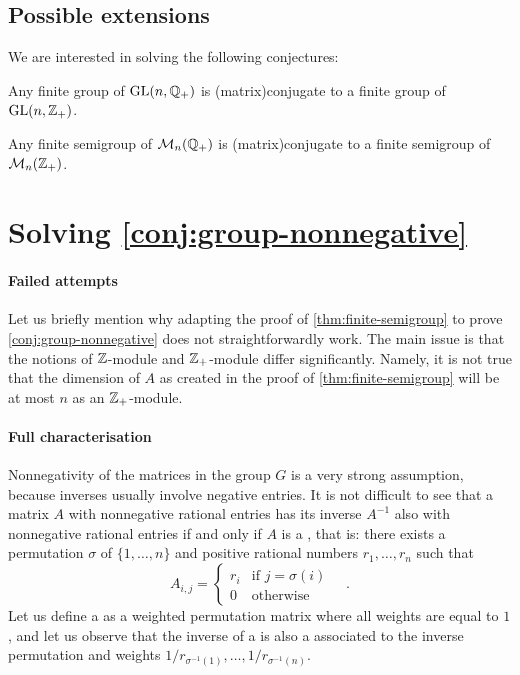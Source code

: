 \subsection{Possible extensions}

We are interested in solving the following conjectures:

\begin{conjecture}
  \label{conj:group-nonnegative}
  Any finite group of $\GL[n]{\Rat_+}$ is \kl(matrix){conjugate} to a finite group of
  $\GL[n]{\Int_+}$.
\end{conjecture}

\begin{conjecture}
  \label{conj:semigroup-nonnegative}
  Any finite semigroup of $\Mat[n]{\Rat_+}$ is \kl(matrix){conjugate} to a finite semigroup of
  $\Mat[n]{\Int_+}$.
\end{conjecture}

\section{Solving \cref{conj:group-nonnegative}}

\paragraph*{Failed attempts} Let us briefly mention why adapting the proof of
\cref{thm:finite-semigroup} to prove \cref{conj:group-nonnegative} does not
straightforwardly work. The main issue is that the notions of $\Int$-module and
$\Int_+$-module differ significantly. Namely, it is not true that the dimension
of $A$ as created in the proof of \cref{thm:finite-semigroup} will be at most
$n$ as an $\Int_+$-module.

\paragraph*{Full characterisation}
\AP
Nonnegativity of the matrices in the group $G$ is a very strong 
assumption, because inverses usually involve negative entries.
It is not difficult to see that a matrix $A$ with nonnegative 
rational entries has its inverse $A^{-1}$ also with nonnegative
rational entries if and only if $A$ is a ,
that is: there exists a permutation $\sigma$ of $\{1, \ldots, n\}$ and
positive rational numbers $r_1, \ldots, r_n$ such that
\begin{equation}
  A_{i,j} = \begin{cases}
    r_i & \text{if } j = \sigma(i) \\
    0 & \text{otherwise}
  \end{cases}
  \quad .
\end{equation}
Let us define a  as a weighted permutation matrix
where all weights are equal to $1$, and let us observe that 
the inverse of a  is also a  associated to the inverse permutation and weights
$1/r_{\sigma^{-1}(1)}, \ldots, 1/r_{\sigma^{-1}(n)}$.

